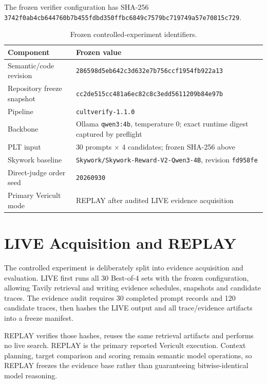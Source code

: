 The frozen verifier configuration has SHA-256
\texttt{3742f0ab4cb644760b7b455fdbd350ffbc6849c7579bc719749a57e70815c729}.

\begin{table}[htbp]
\centering
\footnotesize
\caption{Frozen controlled-experiment identifiers.}
\label{tab:frozen-experiment}
\begin{tabularx}{\textwidth}{p{4.2cm}X}
\toprule
\textbf{Component} & \textbf{Frozen value} \\
\midrule
Semantic/code revision & \texttt{286598d5eb642c3d632e7b756ccf1954fb922a13} \\
Repository freeze snapshot & \texttt{cc2de515cc481a6ec82c8c3edd5611209b84e97b} \\
Pipeline & \texttt{cultverify-1.1.0} \\
Backbone & Ollama \texttt{qwen3:4b}, temperature 0; exact runtime digest captured by preflight \\
PLT input & 30 prompts $\times$ 4 candidates; frozen SHA-256 above \\
Skywork baseline & \texttt{Skywork/Skywork-Reward-V2-Qwen3-4B}, revision \texttt{fd958fe} \\
Direct-judge order seed & \texttt{20260930} \\
Primary Vericult mode & REPLAY after audited LIVE evidence acquisition \\
\bottomrule
\end{tabularx}
\end{table}

\section{LIVE Acquisition and REPLAY}

The controlled experiment is deliberately split into evidence acquisition and evaluation. LIVE first runs all 30 Best-of-4 sets with the frozen configuration, allowing Tavily retrieval and writing evidence schedules, snapshots and candidate traces. The evidence audit requires 30 completed prompt records and 120 candidate traces, then hashes the LIVE output and all trace/evidence artifacts into a freeze manifest.

REPLAY verifies those hashes, reuses the same retrieval artifacts and performs no live search. REPLAY is the primary reported Vericult execution. Context planning, target comparison and scoring remain semantic model operations, so REPLAY freezes the evidence base rather than guaranteeing bitwise-identical model reasoning.

